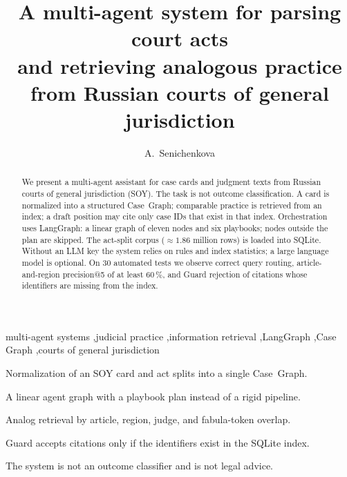 \documentclass[preprint,12pt]{elsarticle}
\begin{document}
\begin{frontmatter}

\title{A multi-agent system for parsing court acts\\
and retrieving analogous practice from Russian courts of general jurisdiction}

\author{A.~Senichenkova}

\begin{abstract}
We present a multi-agent assistant for case cards and judgment texts from Russian courts of general jurisdiction (SOY). The task is not outcome classification. A card is normalized into a structured Case~Graph; comparable practice is retrieved from an index; a draft position may cite only case IDs that exist in that index. Orchestration uses LangGraph: a linear graph of eleven nodes and six playbooks; nodes outside the plan are skipped. The act-split corpus ($\approx 1.86$ million rows) is loaded into SQLite. Without an LLM key the system relies on rules and index statistics; a large language model is optional. On 30 automated tests we observe correct query routing, article-and-region precision@5 of at least $60\,\%$, and Guard rejection of citations whose identifiers are missing from the index.
\end{abstract}

\begin{keyword}
multi-agent systems \sep judicial practice \sep information retrieval \sep LangGraph \sep Case Graph \sep courts of general jurisdiction
\end{keyword}

\end{frontmatter}

\begin{highlights}
\item Normalization of an SOY card and act splits into a single Case~Graph.
\item A linear agent graph with a playbook plan instead of a rigid pipeline.
\item Analog retrieval by article, region, judge, and fabula-token overlap.
\item Guard accepts citations only if the identifiers exist in the SQLite index.
\item The system is not an outcome classifier and is not legal advice.
\end{highlights}
\end{document}
